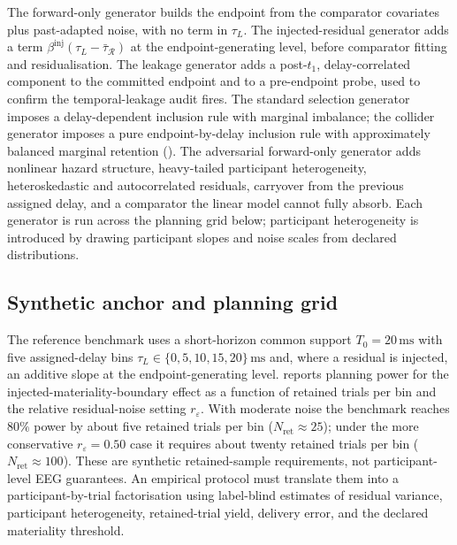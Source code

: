 \documentclass[11pt,a4paper]{article}
\theoremstyle{definition}
\newcommand{\tauL}{\tau_L}
\begin{document}
The forward-only generator builds the endpoint from the comparator covariates
plus past-adapted noise, with no term in \(\tauL\). The injected-residual
generator adds a term \(\beta^{\mathrm{inj}}(\tauL-\bar\tau_{\mathcal R})\) at the
endpoint-generating level, before comparator fitting and residualisation. The
leakage generator adds a post-\(t_1\), delay-correlated component to the committed
endpoint and to a pre-endpoint probe, used to confirm the temporal-leakage audit
fires. The standard selection generator imposes a delay-dependent inclusion rule
with marginal imbalance; the collider generator imposes a pure endpoint-by-delay
inclusion rule with approximately balanced marginal retention
(). The adversarial forward-only generator adds nonlinear
hazard structure, heavy-tailed participant heterogeneity, heteroskedastic and
autocorrelated residuals, carryover from the previous assigned delay, and a
comparator the linear model cannot fully absorb. Each generator is run across the
planning grid below; participant heterogeneity is introduced by drawing participant
slopes and noise scales from declared distributions.

\subsection{Synthetic anchor and planning grid}
\label{sec:si-anchor}

The reference benchmark uses a short-horizon common support
\(T_0=20\,\mathrm{ms}\) with five assigned-delay bins
\(\tauL\in\{0,5,10,15,20\}\,\mathrm{ms}\) and, where a residual is injected, an
additive slope at the endpoint-generating level.  reports
planning power for the
injected-materiality-boundary effect as a function of retained trials per bin and
the relative residual-noise setting \(r_\varepsilon\). With moderate noise the
benchmark reaches \(80\%\) power by about five retained trials per bin
(\(N_{\mathrm{ret}}\approx25\)); under the more conservative
\(r_\varepsilon=0.50\) case it requires about twenty retained trials per bin
(\(N_{\mathrm{ret}}\approx100\)). These are synthetic retained-sample
requirements, not participant-level EEG guarantees. An empirical protocol must
translate them into a participant-by-trial factorisation using label-blind
estimates of residual variance, participant heterogeneity, retained-trial yield,
delivery error, and the declared materiality threshold.
\end{document}
